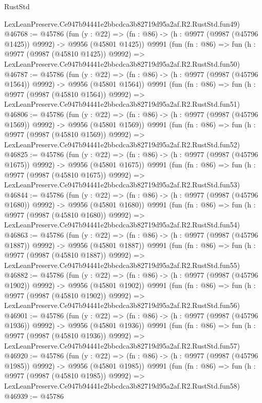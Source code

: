 \begin{lexlean}{RustStd}
\begin{coremodule}
    LexLeanPreserve.Ce947b94441e2bbcdca3b82719d95a2af.R2.RustStd.fun49)
@46768 := @45786
    (fun (y : @22) =>
    (fn : @86) -> (h : @9977 (@9987 (@45796 @1425)) @9992) -> @9956 (@45801 @1425))
    @9991
    (fun (fn : @86) =>
    fun (h : @9977 (@9987 (@45810 @1425)) @9992) =>
    LexLeanPreserve.Ce947b94441e2bbcdca3b82719d95a2af.R2.RustStd.fun50)
@46787 := @45786
    (fun (y : @22) =>
    (fn : @86) -> (h : @9977 (@9987 (@45796 @1564)) @9992) -> @9956 (@45801 @1564))
    @9991
    (fun (fn : @86) =>
    fun (h : @9977 (@9987 (@45810 @1564)) @9992) =>
    LexLeanPreserve.Ce947b94441e2bbcdca3b82719d95a2af.R2.RustStd.fun51)
@46806 := @45786
    (fun (y : @22) =>
    (fn : @86) -> (h : @9977 (@9987 (@45796 @1569)) @9992) -> @9956 (@45801 @1569))
    @9991
    (fun (fn : @86) =>
    fun (h : @9977 (@9987 (@45810 @1569)) @9992) =>
    LexLeanPreserve.Ce947b94441e2bbcdca3b82719d95a2af.R2.RustStd.fun52)
@46825 := @45786
    (fun (y : @22) =>
    (fn : @86) -> (h : @9977 (@9987 (@45796 @1675)) @9992) -> @9956 (@45801 @1675))
    @9991
    (fun (fn : @86) =>
    fun (h : @9977 (@9987 (@45810 @1675)) @9992) =>
    LexLeanPreserve.Ce947b94441e2bbcdca3b82719d95a2af.R2.RustStd.fun53)
@46844 := @45786
    (fun (y : @22) =>
    (fn : @86) -> (h : @9977 (@9987 (@45796 @1680)) @9992) -> @9956 (@45801 @1680))
    @9991
    (fun (fn : @86) =>
    fun (h : @9977 (@9987 (@45810 @1680)) @9992) =>
    LexLeanPreserve.Ce947b94441e2bbcdca3b82719d95a2af.R2.RustStd.fun54)
@46863 := @45786
    (fun (y : @22) =>
    (fn : @86) -> (h : @9977 (@9987 (@45796 @1887)) @9992) -> @9956 (@45801 @1887))
    @9991
    (fun (fn : @86) =>
    fun (h : @9977 (@9987 (@45810 @1887)) @9992) =>
    LexLeanPreserve.Ce947b94441e2bbcdca3b82719d95a2af.R2.RustStd.fun55)
@46882 := @45786
    (fun (y : @22) =>
    (fn : @86) -> (h : @9977 (@9987 (@45796 @1902)) @9992) -> @9956 (@45801 @1902))
    @9991
    (fun (fn : @86) =>
    fun (h : @9977 (@9987 (@45810 @1902)) @9992) =>
    LexLeanPreserve.Ce947b94441e2bbcdca3b82719d95a2af.R2.RustStd.fun56)
@46901 := @45786
    (fun (y : @22) =>
    (fn : @86) -> (h : @9977 (@9987 (@45796 @1936)) @9992) -> @9956 (@45801 @1936))
    @9991
    (fun (fn : @86) =>
    fun (h : @9977 (@9987 (@45810 @1936)) @9992) =>
    LexLeanPreserve.Ce947b94441e2bbcdca3b82719d95a2af.R2.RustStd.fun57)
@46920 := @45786
    (fun (y : @22) =>
    (fn : @86) -> (h : @9977 (@9987 (@45796 @1985)) @9992) -> @9956 (@45801 @1985))
    @9991
    (fun (fn : @86) =>
    fun (h : @9977 (@9987 (@45810 @1985)) @9992) =>
    LexLeanPreserve.Ce947b94441e2bbcdca3b82719d95a2af.R2.RustStd.fun58)
@46939 := @45786

\end{coremodule}
\end{lexlean}
